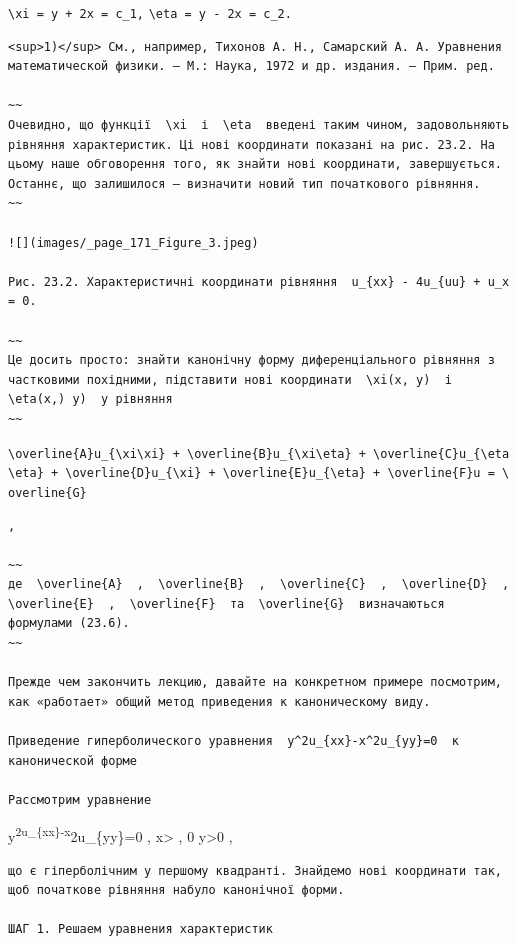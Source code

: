 \documentclass[
  ukrainian,
]{article}
\begin{document}
\texttt{\textbackslash{}xi\ =\ y\ +\ 2x\ =\ c\_1,}
\texttt{\textbackslash{}eta\ =\ y\ -\ 2x\ =\ c\_2.}

\begin{verbatim}
<sup>1)</sup> См., например, Тихонов А. Н., Самарский А. А. Уравнения математической физики. — М.: Наука, 1972 и др. издания. — Прим. ред.

~~
Очевидно, що функції  \xi  і  \eta  введені таким чином, задовольняють рівняння характеристик. Ці нові координати показані на рис. 23.2. На цьому наше обговорення того, як знайти нові координати, завершується. Останнє, що залишилося — визначити новий тип початкового рівняння.
~~

![](images/_page_171_Figure_3.jpeg)

Рис. 23.2. Характеристичні координати рівняння  u_{xx} - 4u_{uu} + u_x = 0.

~~
Це досить просто: знайти канонічну форму диференціального рівняння з частковими похідними, підставити нові координати  \xi(x, y)  і  \eta(x,) y)  у рівняння
~~
\end{verbatim}

\texttt{\textbackslash{}overline\{A\}u\_\{\textbackslash{}xi\textbackslash{}xi\}\ +\ \textbackslash{}overline\{B\}u\_\{\textbackslash{}xi\textbackslash{}eta\}\ +\ \textbackslash{}overline\{C\}u\_\{\textbackslash{}eta\textbackslash{}eta\}\ +\ \textbackslash{}overline\{D\}u\_\{\textbackslash{}xi\}\ +\ \textbackslash{}overline\{E\}u\_\{\textbackslash{}eta\}\ +\ \textbackslash{}overline\{F\}u\ =\ \textbackslash{}overline\{G\}}

\begin{verbatim}
,

~~
де  \overline{A}  ,  \overline{B}  ,  \overline{C}  ,  \overline{D}  ,  \overline{E}  ,  \overline{F}  та  \overline{G}  визначаються формулами (23.6).
~~

Прежде чем закончить лекцию, давайте на конкретном примере посмотрим, как «работает» общий метод приведения к каноническому виду.

Приведение гиперболического уравнения  y^2u_{xx}-x^2u_{yy}=0  к канонической форме

Рассмотрим уравнение
\end{verbatim}

y\textsuperscript{2u\_\{xx\}-x}2u\_\{yy\}=0 , x\textgreater{} , 0
y\textgreater0 ,

\begin{verbatim}
що є гіперболічним у першому квадранті. Знайдемо нові координати так, щоб початкове рівняння набуло канонічної форми.

ШАГ 1. Решаем уравнения характеристик
\end{verbatim}
\end{document}
